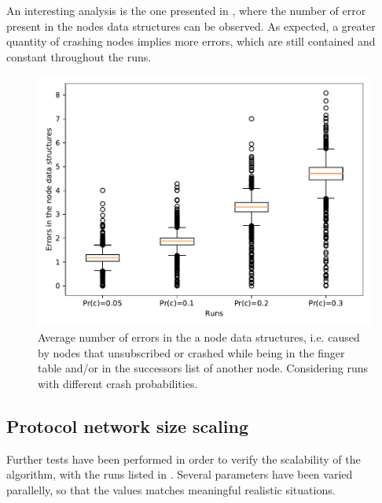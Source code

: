 \documentclass[11pt,twocolumn,letterpaper]{article}
\begin{document}
		An interesting analysis is the one presented in , where the number of error present in the nodes data structures can be observed. As expected, a greater quantity of crashing nodes implies more errors, which are still contained and constant throughout the runs.
		
		\begin{figure}[!h]
			\centering
			\includegraphics[width=\linewidth,clip,trim=0 0.5cm 0 0.35cm]{figures/analysis1/errors_box.pdf}
			\caption{Average number of errors in the a node data structures, i.e. caused by nodes that unsubscribed or crashed while being in the finger table and/or in the successors list of another node. Considering runs with different crash probabilities.}
			\label{fig:crash7}
		\end{figure}
	
	\subsection{Protocol network size scaling}
	\label{subsec:netsize_analysis}
	Further tests have been performed in order to verify the scalability of the algorithm, with the runs listed in . Several parameters have been varied parallelly, so that the values matches meaningful realistic situations. 
\end{document}
